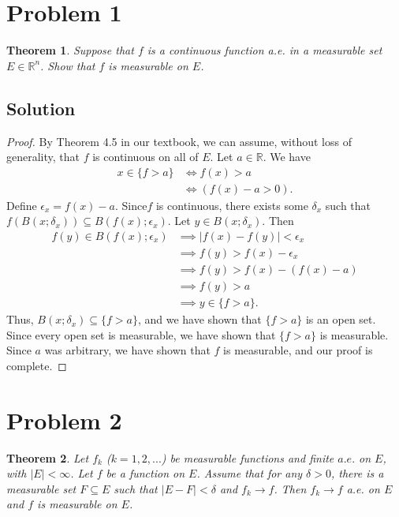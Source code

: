 \documentclass[10pt,a4paper]{article}
\author{Jeremiah Givens}
\theoremstyle{theorem}
\newtheorem{theorem}{Theorem}
\theoremstyle{definition}
\begin{document}
\section*{Problem 1}
\begin{theorem}
Suppose that $f$ is a continuous function a.e. in a measurable set $E \in \mathbb{R}^n$. Show that $f$ is measurable on $E$.
\end{theorem}

\subsection*{Solution}
\begin{proof}
By Theorem 4.5 in our textbook, we can assume, without loss of generality, that $f$ is continuous on all of $E$. Let $a \in \mathbb{R}$. We have
\begin{align*}
x \in \{f > a\} &\iff f(x) > a\\
&\iff (f(x) - a > 0).
\end{align*}
Define $\epsilon_x = f(x) - a$. Since$f$ is continuous, there exists some $\delta_x$ such that $f(B(x; \delta_x)) \subseteq B(f(x); \epsilon_x)$.  Let $y \in B(x; \delta_x)$. Then
\begin{align*}
f(y) \in B(f(x); \epsilon_x) &\implies |f(x) - f(y)| < \epsilon_x\\
&\implies f(y) > f(x) - \epsilon_x\\
&\implies f(y) > f(x) - (f(x) - a)\\
&\implies f(y) > a\\
&\implies y \in \{f > a\}.
\end{align*} 
Thus, $B(x; \delta_x) \subseteq \{f > a\}$, and we have shown that $\{f > a\}$ is an open set. Since every open set is measurable, we have shown that $\{f > a\}$ is measurable. Since $a$ was arbitrary, we have shown that $f$ is measurable, and our proof is complete.
\end{proof}

\section*{Problem 2}
\begin{theorem}
Let $f_k$ ($k=1,2,...$) be measurable functions and finite $a.e.$ on $E$, with $|E| < \infty$. Let $f$ be a function on $E$. Assume that for any $\delta > 0$, there is a measurable set $F \subseteq E$ such that $|E - F| < \delta$ and $f_k \to f$. Then $f_k \to f$ a.e. on $E$ and $f$ is measurable on $E$.
\end{theorem}
\end{document}
